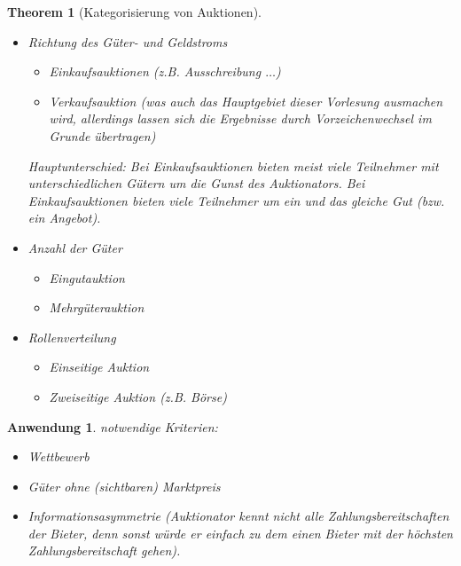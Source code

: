 \documentclass[12pt]{extreport} %
\theoremstyle{named}
\newtheorem*{unnamedtheorem*}{Theorem}
\theoremstyle{itshape}
\theoremstyle{normal}
\newtheorem{anwendung}[unnamedtheorem]{Anwendung}
\begin{document}
\newpage

\begin{unnamedtheorem*}[Kategorisierung von Auktionen] ~\
	\begin{itemize}
		\item Richtung des Güter- und Geldstroms
			\begin{itemize}
				\item Einkaufsauktionen (z.B. Ausschreibung $\dotsc$)
				\item Verkaufsauktion (was auch das Hauptgebiet dieser Vorlesung ausmachen wird, allerdings lassen sich die Ergebnisse durch Vorzeichenwechsel im Grunde übertragen)
			\end{itemize}
			Hauptunterschied: Bei Einkaufsauktionen bieten meist viele Teilnehmer mit unterschiedlichen Gütern um die Gunst des Auktionators.
			Bei Einkaufsauktionen bieten viele Teilnehmer um ein und das gleiche Gut (bzw. ein Angebot).
		\item Anzahl der Güter
			\begin{itemize}
				\item Eingutauktion
				\item Mehrgüterauktion
			\end{itemize}
		\item Rollenverteilung
			\begin{itemize}
				\item Einseitige Auktion
				\item Zweiseitige Auktion (z.B. Börse)
			\end{itemize}
	\end{itemize}
\end{unnamedtheorem*}

\begin{anwendung}
	notwendige Kriterien:
	\begin{itemize}
		\item Wettbewerb
		\item Güter ohne (sichtbaren) Marktpreis
		\item Informationsasymmetrie (Auktionator kennt nicht alle Zahlungsbereitschaften der Bieter, denn sonst würde er einfach zu dem einen Bieter mit der höchsten Zahlungsbereitschaft gehen).
	\end{itemize}
\end{anwendung}

\newpage
\end{document}
